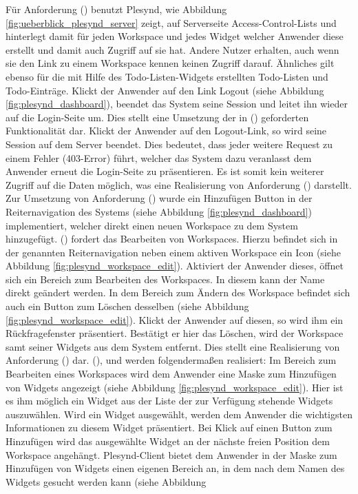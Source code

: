 Für Anforderung  (\emph{\requirementZugriffAufEigeneWidgets}) benutzt Plesynd, wie Abbildung \ref{fig:ueberblick_plesynd_server} zeigt, auf Serverseite Access-Control-Lists und hinterlegt damit für jeden Workspace und jedes Widget welcher Anwender diese erstellt und damit auch Zugriff auf sie hat. Andere Nutzer erhalten, auch wenn sie den Link zu einem Workspace kennen keinen Zugriff darauf. Ähnliches gilt ebenso für die mit Hilfe des Todo-Listen-Widgets erstellten Todo-Listen und Todo-Einträge. Klickt der Anwender auf den Link Logout (siehe Abbildung \ref{fig:plesynd_dashboard}), beendet das System seine Session und leitet ihn wieder auf die Login-Seite um. Dies stellt eine Umsetzung der in  (\emph{\requirementLogout}) geforderten Funktionalität dar. Klickt der Anwender auf den Logout-Link, so wird seine Session auf dem Server beendet. Dies bedeutet, dass jeder weitere Request zu einem Fehler (403-Error) führt, welcher das System dazu veranlasst dem Anwender erneut die Login-Seite zu präsentieren. Es ist somit kein weiterer Zugriff auf die Daten möglich, was eine Realisierung von Anforderung  (\emph{\requirementKeinZugriffNachLogout}) darstellt. Zur Umsetzung von Anforderung  (\emph{\requirementWorkspaceAdd}) wurde ein Hinzufügen Button in der Reiternavigation des Systems (siehe Abbildung \ref{fig:plesynd_dashboard}) implementiert, welcher direkt einen neuen Workspace zu dem System hinzugefügt.   (\emph{\requirementWorkspaceEdit}) fordert das Bearbeiten von Workspaces. Hierzu befindet sich in der genannten Reiternavigation neben einem aktiven Workspace ein Icon (siehe Abbildung \ref{fig:plesynd_workspace_edit}). Aktiviert der Anwender dieses, öffnet sich ein Bereich zum Bearbeiten des Workspaces. In diesem kann der Name direkt geändert werden. In dem Bereich zum Ändern des Workspace befindet sich auch ein Button zum Löschen desselben (siehe Abbildung \ref{fig:plesynd_workspace_edit}). Klickt der Anwender auf diesen, so wird ihm ein Rückfragefenster präsentiert. Bestätigt er hier das Löschen, wird der Workspace samt seiner Widgets aus dem System entfernt. Dies stellt eine Realisierung von Anforderung  (\emph{\requirementWorkspaceDelete}) dar.  (\emph{\requirementWidgetAdd}),  \emph{\requirementWidgetFilterName} und  \emph{\requirementWidgetFilterOnline} werden folgendermaßen realisiert: Im Bereich zum Bearbeiten eines Workspaces wird dem Anwender eine Maske zum Hinzufügen von Widgets angezeigt (siehe Abbildung \ref{fig:plesynd_workspace_edit}). Hier ist es ihm möglich ein Widget aus der Liste der zur Verfügung stehende Widgets auszuwählen. Wird ein Widget ausgewählt, werden dem Anwender die wichtigsten Informationen zu diesem Widget präsentiert. Bei Klick auf einen Button zum Hinzufügen wird das ausgewählte Widget an der nächste freien Position dem Workspace angehängt. Plesynd-Client bietet dem Anwender in der Maske zum Hinzufügen von Widgets einen eigenen Bereich an, in dem nach dem Namen des Widgets gesucht werden kann (siehe Abbildung 